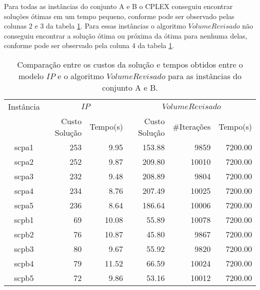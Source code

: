 Para todas as instâncias do conjunto A e B o CPLEX conseguiu encontrar soluções ótimas em um tempo pequeno, conforme
pode ser observado pelas colunas 2 e 3 da tabela \ref{table:resultadosaeb}. Para essas instâncias o algoritmo {$VolumeRevisado$}
não conseguiu encontrar a solução ótima ou próxima da ótima para nenhuma delas, conforme pode ser observado pela coluna 4 da 
tabela \ref{table:resultadosaeb}.
\begin{table}[htbp]
\begin{center}
  \begin{tabular}{|c|r|r|r|r|r|}
    \hline
      Instância & \multicolumn{2}{|c|}{$IP$} & \multicolumn{3}{|c|}{$VolumeRevisado$}\\
                & Custo Solução    & Tempo(s)  & Custo Solução   & \#Iterações & Tempo(s)      \\ \hline
      scpa1     & 253              & 9.95      & 153.88          & 9859     & 7200.00  \\ \hline
      scpa2     & 252              & 9.87      & 209.80          & 10010    & 7200.00  \\ \hline
      scpa3     & 232              & 9.48      & 208.89          & 9804     & 7200.00 \\ \hline
      scpa4     & 234              & 8.76      & 207.49          & 10025    & 7200.00  \\ \hline
      scpa5     & 236              & 8.64      & 186.64          & 10006    & 7200.00 \\ \hline
      scpb1     & 69               & 10.08     & 55.89           & 10078    & 7200.00  \\ \hline
      scpb2     & 76               & 10.87     & 45.80           & 9867     & 7200.00  \\ \hline
      scpb3     & 80               & 9.67      & 55.92           & 9820     & 7200.00  \\ \hline
      scpb4     & 79               & 11.52     & 66.59           & 10024    & 7200.00  \\ \hline
      scpb5     & 72               & 9.86      & 53.16           & 10012    & 7200.00  \\ \hline
  \end{tabular}
\caption{Comparação entre os custos da solução e tempos obtidos entre o modelo $IP$ e o algoritmo $VolumeRevisado$ para as instâncias do conjunto A e B.}
\label{table:resultadosaeb}
\end{center}
\end{table}












